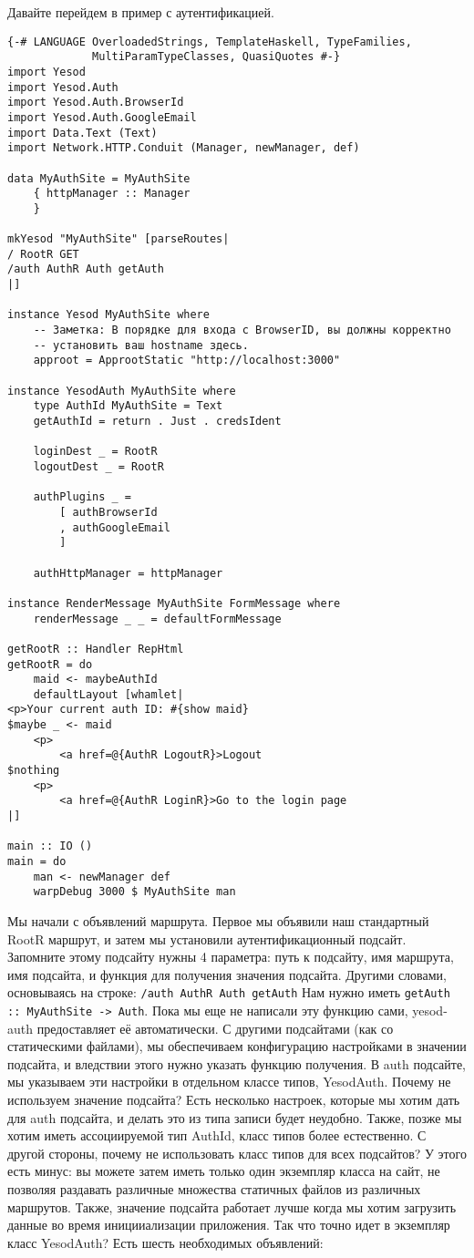 Давайте перейдем в пример с аутентификацией.
\begin{lstlisting}
{-# LANGUAGE OverloadedStrings, TemplateHaskell, TypeFamilies,
             MultiParamTypeClasses, QuasiQuotes #-}
import Yesod
import Yesod.Auth
import Yesod.Auth.BrowserId
import Yesod.Auth.GoogleEmail
import Data.Text (Text)
import Network.HTTP.Conduit (Manager, newManager, def)

data MyAuthSite = MyAuthSite
    { httpManager :: Manager
    }

mkYesod "MyAuthSite" [parseRoutes|
/ RootR GET
/auth AuthR Auth getAuth
|]

instance Yesod MyAuthSite where
    -- Заметка: В порядке для входа с BrowserID, вы должны корректно
    -- установить ваш hostname здесь.
    approot = ApprootStatic "http://localhost:3000"

instance YesodAuth MyAuthSite where
    type AuthId MyAuthSite = Text
    getAuthId = return . Just . credsIdent

    loginDest _ = RootR
    logoutDest _ = RootR

    authPlugins _ =
        [ authBrowserId
        , authGoogleEmail
        ]

    authHttpManager = httpManager

instance RenderMessage MyAuthSite FormMessage where
    renderMessage _ _ = defaultFormMessage

getRootR :: Handler RepHtml
getRootR = do
    maid <- maybeAuthId
    defaultLayout [whamlet|
<p>Your current auth ID: #{show maid}
$maybe _ <- maid
    <p>
        <a href=@{AuthR LogoutR}>Logout
$nothing
    <p>
        <a href=@{AuthR LoginR}>Go to the login page
|]

main :: IO ()
main = do
    man <- newManager def
    warpDebug 3000 $ MyAuthSite man
\end{lstlisting}
Мы начали с объявлений маршрута. Первое мы объявили наш стандартный RootR маршрут, и затем мы установили аутентификационный подсайт. Запомните этому подсайту нужны 4 параметра: путь к подсайту, имя маршрута, имя подсайта, и функция для получения значения подсайта. Другими словами, основываясь на строке:
\lstinline'/auth AuthR Auth getAuth'
Нам нужно иметь \lstinline'getAuth :: MyAuthSite -> Auth'. Пока мы еще не написали эту функцию сами, yesod-auth предоставляет её автоматически. С другими подсайтами (как со статическими файлами), мы обеспечиваем конфигурацию настройками в значении подсайта, и вледствии этого нужно указать функцию получения. В auth подсайте, мы указываем эти настройки в отдельном классе типов, YesodAuth.
Почему не используем значение подсайта? Есть несколько настроек, которые мы хотим дать для auth подсайта, и делать это из типа записи будет неудобно. Также, позже мы хотим иметь ассоциируемой тип AuthId, класс типов более естественно.
С другой стороны, почему не использовать класс типов для всех подсайтов? У этого есть минус: вы можете затем иметь только один экземпляр класса на сайт, не позволяя раздавать различные множества статичных файлов из различных маршрутов. Также, значение подсайта работает лучше когда мы хотим загрузить данные во время иницииализации приложения.
Так что точно идет в экземпляр класс YesodAuth? Есть шесть необходимых объявлений:
